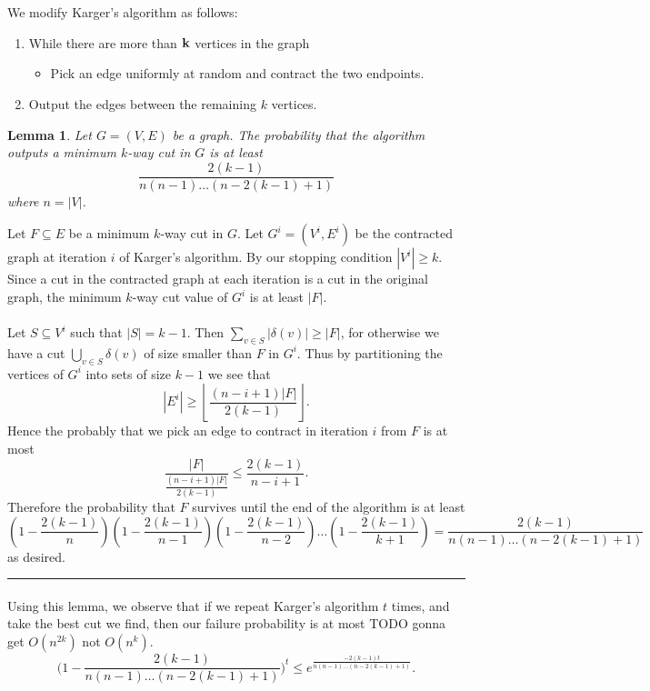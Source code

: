 \documentclass[letterpaper,12pt,oneside,onecolumn]{article}
\newenvironment{proof}{{\bf Proof:  }}{\hfill\rule{2mm}{2mm}}
\newtheorem{lemma}[fact]{Lemma}
\newcommand{\floor}[1]{\ensuremath{\left\lfloor#1\right\rfloor}}
\begin{document}
\section{}
\paragraph{}
We modify Karger's algorithm as follows:
\begin{enumerate}
\item While there are more than $\bf{k}$ vertices in the graph
	\begin{itemize}
		\item Pick an edge uniformly at random and contract the two endpoints.
	\end{itemize}
\item Output the edges between the remaining $k$ vertices.
\end{enumerate}
\begin{lemma}
Let $G=(V,E)$ be a graph. The probability that the algorithm outputs a minimum $k$-way cut in $G$ is at least $$\frac{2(k-1)}{n(n-1)\dots(n-2(k-1)+1)}$$ where $n = |V|$.
\end{lemma}
\begin{proof}
Let $F\subseteq E$ be a minimum $k$-way cut in $G$. Let $G^i=(V^i,E^i)$ be the contracted graph at iteration $i$ of Karger's algorithm. By our stopping condition $|V^i| \geq k$. Since a cut in the contracted graph at each iteration is a cut in the original graph, the minimum $k$-way cut value of $G^i$ is at least $|F|$.
\paragraph{}
Let $S\subseteq V^i$ such that $|S|=k-1$. Then $\sum_{v \in S} |\delta(v)| \geq |F|$, for otherwise we have a cut $\bigcup_{v\in S} \delta(v)$ of size smaller than $F$ in $G^i$. Thus by partitioning the vertices of $G^i$ into sets of size $k-1$ we see that
$$|E^i| \geq \floor{\frac{(n-i+1)|F|}{2(k-1)}}.$$
Hence the probably that we pick an edge to contract in iteration $i$ from $F$ is at most
$$ \frac{|F|}{\frac{(n-i+1)|F|}{2(k-1)}} \leq \frac{2(k-1)}{n-i+1}.$$
Therefore the probability that $F$ survives until the end of the algorithm is at least
$$(1-\frac{2(k-1)}{n})(1-\frac{2(k-1)}{n-1})(1-\frac{2(k-1)}{n-2})\dots(1-\frac{2(k-1)}{k+1}) = \frac{2(k-1)}{n(n-1)\dots(n-2(k-1)+1)}$$
as desired.
\end{proof}
\paragraph{}
Using this lemma, we observe that if we repeat Karger's algorithm $t$ times, and take the best cut we find, then our failure probability is at most TODO gonna get $O(n^{2k})$ not $O(n^k)$.
$$\big(1 -  \frac{2(k-1)}{n(n-1)\dots(n-2(k-1)+1)}\big)^t \leq e^\frac{-2(k-1)t}{n(n-1)\dots(n-2(k-1)+1)}.$$
\end{document}
